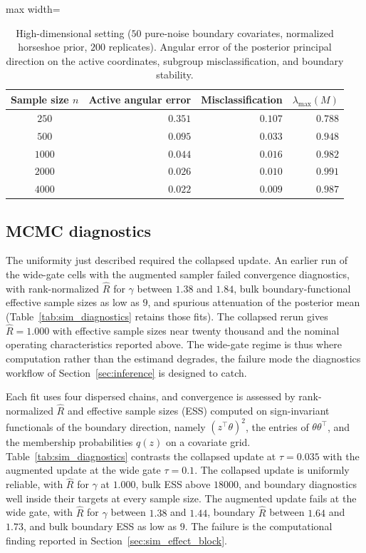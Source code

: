 \documentclass[11pt]{article}
\theoremstyle{definition}
\theoremstyle{plain}
\begin{document}
\begin{table}
  \centering
  \caption{High-dimensional setting ($50$ pure-noise boundary covariates, normalized horseshoe prior, $200$ replicates). Angular error of the posterior principal direction on the active coordinates, subgroup misclassification, and boundary stability.}
  \begin{adjustbox}{max width=\textwidth}
  \begin{tabular}{c rrr}
    \toprule
    \textbf{Sample size $n$} & Active angular error & Misclassification & $\lambda_{\max}(M)$ \\
    \midrule
    $250$  & $0.351$ & $0.107$ & $0.788$ \\
    $500$  & $0.095$ & $0.033$ & $0.948$ \\
    $1000$ & $0.044$ & $0.016$ & $0.982$ \\
    $2000$ & $0.026$ & $0.010$ & $0.991$ \\
    $4000$ & $0.022$ & $0.009$ & $0.987$ \\
    \bottomrule
  \end{tabular}
  \end{adjustbox}
  \label{tab:sim_inactive}
\end{table}

\subsection{MCMC diagnostics}
\label{sec:sim_diagnostics}

The uniformity just described required the collapsed update. An earlier run of the wide-gate cells with the augmented sampler failed convergence diagnostics, with rank-normalized $\widehat R$ for $\gamma$ between $1.38$ and $1.84$, bulk boundary-functional effective sample sizes as low as $9$, and spurious attenuation of the posterior mean (Table~\ref{tab:sim_diagnostics} retains those fits). The collapsed rerun gives $\widehat R=1.000$ with effective sample sizes near twenty thousand and the nominal operating characteristics reported above. The wide-gate regime is thus where computation rather than the estimand degrades, the failure mode the diagnostics workflow of Section~\ref{sec:inference} is designed to catch.

Each fit uses four dispersed chains, and convergence is assessed by rank-normalized $\widehat R$ and effective sample sizes (ESS) computed on sign-invariant functionals of the boundary direction, namely $(z^\top\theta)^2$, the entries of $\theta\theta^\top$, and the membership probabilities $q(z)$ on a covariate grid. Table~\ref{tab:sim_diagnostics} contrasts the collapsed update at $\tau=0.035$ with the augmented update at the wide gate $\tau=0.1$. The collapsed update is uniformly reliable, with $\widehat R$ for $\gamma$ at $1.000$, bulk ESS above $18000$, and boundary diagnostics well inside their targets at every sample size. The augmented update fails at the wide gate, with $\widehat R$ for $\gamma$ between $1.38$ and $1.44$, boundary $\widehat R$ between $1.64$ and $1.73$, and bulk boundary ESS as low as $9$. The failure is the computational finding reported in Section~\ref{sec:sim_effect_block}.
\end{document}
